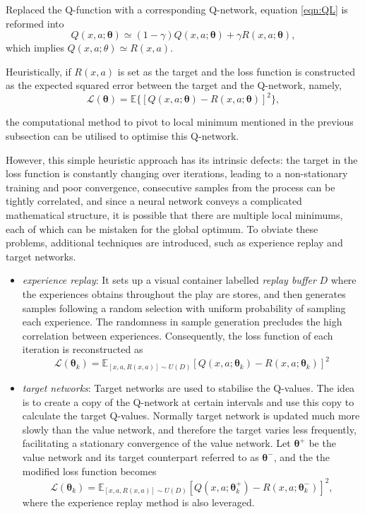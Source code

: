 \documentclass[11pt,twoside]{article}
\numberwithin{Theorem}{section}
\numberwithin{Definition}{section}
\numberwithin{Lemma}{section}
\numberwithin{Algorithm}{section}
\numberwithin{equation}{section}
\begin{document}
Replaced the Q-function with a corresponding Q-network, equation \ref{eqn:QL} is reformed into
\begin{equation*}
    Q(x,a;\boldsymbol{\theta})\simeq(1-\gamma)Q(x,a;\boldsymbol{\theta})+\gamma R(x,a;\boldsymbol{\theta}),
\end{equation*}
which implies $Q(x,a;\theta)\simeq R(x,a)$.

Heuristically, if $R(x,a)$ is set as the target and the loss function is constructed as the expected squared error between the target and the Q-network, namely,
\begin{equation}\label{eqn:TD}
\mathcal{L}(\boldsymbol{\theta})=\mathbb{E}\{\left[
Q(x,a;\boldsymbol{\theta})-R(x,a;\boldsymbol{\theta})
\right]^2\},
\end{equation}

the computational method to pivot to local minimum mentioned in the previous subsection can be utilised to optimise this Q-network. \cite{DQN}

However, this simple heuristic approach has its intrinsic defects: the target in the loss function is constantly changing over iterations, leading to a non-stationary training and poor convergence, consecutive samples from the process can be tightly correlated, and since a neural network conveys a complicated mathematical structure, it is possible that there are multiple local minimums, each of which can be mistaken for the global optimum. To obviate these problems, additional techniques are introduced, such as experience replay and target networks.

\begin{itemize}
    \item \emph{experience replay}: It sets up a visual container labelled \emph{replay buffer} $D$ where the experiences obtains throughout the play are stores, and then generates samples following a random selection with uniform probability of sampling each experience. The randomness in sample generation precludes the high correlation between experiences. Consequently, the loss function of each iteration is reconstructed as
    $$
    \mathcal{L}(\boldsymbol{\theta}_k)=\mathbb{E}_{[x,a,R(x,a)]\sim U(D)}\left[
    Q(x,a;\boldsymbol{\theta}_k)-R(x,a;\boldsymbol{\theta}_k)
    \right]^2
    $$
    \item \emph{target networks}: Target networks are used to stabilise the Q-values. The idea is to create a copy of the Q-network at certain intervals and use this copy to calculate the target Q-values. Normally target network is updated much more slowly than the value network, and therefore the target varies less frequently, facilitating a stationary convergence of the value network. Let $\boldsymbol{\theta}^+$ be the value network and its target counterpart referred to as $\boldsymbol{\theta}^-$, and the the modified loss function becomes
    $$
    \mathcal{L}(\boldsymbol{\theta}_k)=\mathbb{E}_{[x,a,R(x,a)]\sim U(D)}\left[
    Q(x,a;\boldsymbol{\theta}^+_k)-R(x,a;\boldsymbol{\theta}^-_k)
    \right]^2,
    $$
    where the experience replay method is also leveraged.
\end{itemize}
\end{document}
